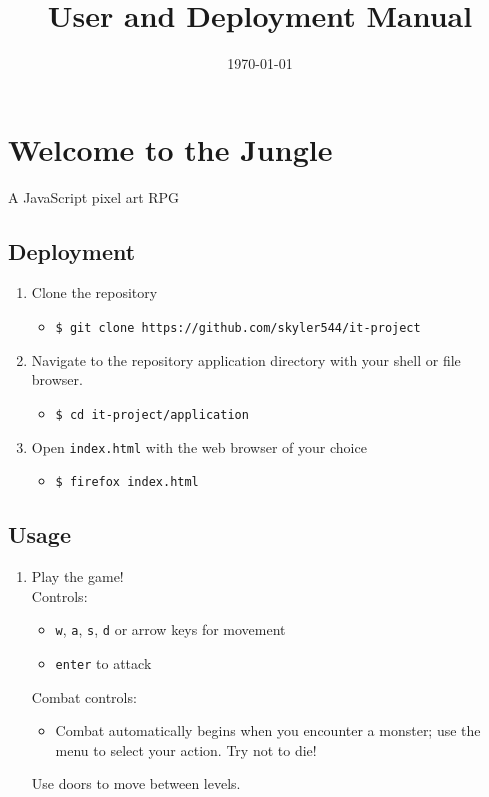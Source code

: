 \documentclass[11pt]{article}
\date{\today}
\title{User and Deployment Manual}
\begin{document}
\maketitle


\section{Welcome to the Jungle}
\label{sec:orgc70657d}
A JavaScript pixel art RPG\\

\subsection{Deployment}
\label{sec:orga8dc089}
\begin{enumerate}
\item Clone the repository\\
\begin{itemize}
\item \texttt{\$ git clone https://github.com/skyler544/it-project}\\
\end{itemize}
\item Navigate to the repository application directory with your shell or file browser.\\
\begin{itemize}
\item \texttt{\$ cd it-project/application}\\
\end{itemize}
\item Open \texttt{index.html} with the web browser of your choice\\
\begin{itemize}
\item \texttt{\$ firefox index.html}\\
\end{itemize}
\end{enumerate}

\subsection{Usage}
\label{sec:orgbd5d37c}
\begin{enumerate}
\item Play the game!\\
Controls:\\
\begin{itemize}
\item \texttt{w}, \texttt{a}, \texttt{s}, \texttt{d} or arrow keys for movement\\
\item \texttt{enter} to attack\\
\end{itemize}
Combat controls:\\
\begin{itemize}
\item Combat automatically begins when you encounter a monster; use the menu to select your action. Try not to die!\\
\end{itemize}
Use doors to move between levels.\\
\end{enumerate}
\end{document}
